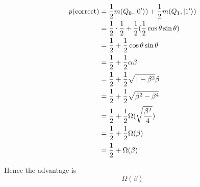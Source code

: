 \begin{align*}
    p(\text{correct}) &= \frac{1}{2} m(Q_0, \lvert0'\rangle) + \frac{1}{2} m(Q_1, \lvert1'\rangle)\\
     &= \frac{1}{2}\cdot \frac{1}{2} + \frac{1}{2} (\frac{1}{2} \cos\theta \sin\theta)\\
     &= \frac{1}{2} + \frac{1}{2} \cos\theta \sin\theta\\
     &= \frac{1}{2} + \frac{1}{2} \alpha \beta\\
     &= \frac{1}{2} + \frac{1}{2} \sqrt{1-\beta^2} \beta\\
     &= \frac{1}{2} + \frac{1}{2} \sqrt{\beta^2-\beta^4}\\
     &= \frac{1}{2} + \frac{1}{2} \Omega(\sqrt{\frac{\beta^2}{4}})\\
     &= \frac{1}{2} + \frac{1}{2} \Omega(\beta)\\
     &= \frac{1}{2} + \Omega(\beta)\\
\end{align*}

Hence the advantage is
\[
    \Omega(\beta)
\]